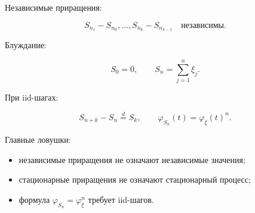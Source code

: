 \documentclass[
  11pt,
  a4paper,
]{article}
\providecommand{\tightlist}{%
  \setlength{\itemsep}{0pt}\setlength{\parskip}{0pt}}
\begin{document}
Независимые приращения:

\[
S_{n_1}-S_{n_0},\ldots,S_{n_k}-S_{n_{k-1}}
\quad\text{независимы}.
\]

Блуждание:

\[
S_0=0,
\qquad
S_n=\sum_{j=1}^n\xi_j.
\]

При iid-шагах:

\[
S_{n+k}-S_n\stackrel d=S_k,
\qquad
\varphi_{S_n}(t)=\varphi_\xi(t)^n.
\]

Главные ловушки:

\begin{itemize}
\tightlist
\item
  независимые приращения не означают независимые значения;
\item
  стационарные приращения не означают стационарный процесс;
\item
  формула \(\varphi_{S_n}=\varphi_\xi^n\) требует iid-шагов.
\end{itemize}

\newpage
\end{document}
